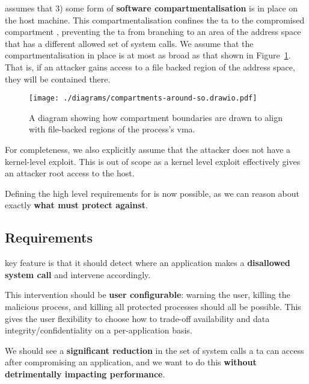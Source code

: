 \af assumes that 3) some form of \textbf{software compartmentalisation} is in
place on the host machine. This compartmentalisation confines the \ac{ta} to the
compromised compartment \cite{SOK}, preventing the \ac{ta} 
from branching to an area of the address space that has a different allowed set
of system calls. We assume that the compartmentalisation in place is at most as
broad as that shown in Figure~\ref{fig:compartments-around-vma}. That is, if an
attacker gains access to a file backed region of the address space, they will be
contained there.

\begin{figure}[ht]
    \centering
    \texttt{[image: ./diagrams/compartments-around-so.drawio.pdf]} 
    \caption{A diagram showing how compartment boundaries are drawn to align
    with file-backed regions of the process's \ac{vma}.}
    \label{fig:compartments-around-vma}
\end{figure}

For completeness, we also explicitly assume that the attacker does not have a
kernel-level exploit. This is out of scope as a kernel level exploit effectively
gives an attacker root access to the host.

Defining the high level requirements for \af is now possible, as we can reason
about exactly \textbf{what \af must protect against}.


\subsection{Requirements} \label{subsec:requirements}

\afg key feature is that it should detect where an application makes a 
\textbf{disallowed system call} and intervene accordingly. 

This intervention should be \textbf{user configurable}: warning the user, killing 
the malicious process, and killing all protected processes should all be
possible. This gives the user flexibility to choose how to trade-off
availability and data integrity/confidentiality on a per-application basis.

We should see a \textbf{significant reduction} in the set of system calls a \ac{ta}
can access after compromising an application, and we want to do this
\textbf{without detrimentally impacting performance}.

